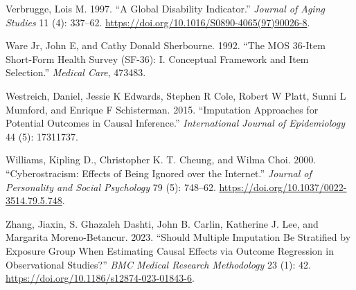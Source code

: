 \documentclass[
  singlecolumn]{report}
\newlength{\cslhangindent}
\newlength{\cslentryspacingunit} %
\newenvironment{CSLReferences}[2] %
 {%
  \setlength{\parindent}{0pt}
  \ifodd #1
  \let\oldpar\par
  \def\par{\hangindent=\cslhangindent\oldpar}
  \fi
  \setlength{\parskip}{#2\cslentryspacingunit}
 }%
 {}
\begin{document}
\begin{CSLReferences}{1}{0}
\leavevmode{}%
Verbrugge, Lois M. 1997. {``A Global Disability Indicator.''}
\emph{Journal of Aging Studies} 11 (4): 337--62.
\url{https://doi.org/10.1016/S0890-4065(97)90026-8}.

\leavevmode{}%
Ware Jr, John E, and Cathy Donald Sherbourne. 1992. {``The MOS 36-Item
Short-Form Health Survey (SF-36): I. Conceptual Framework and Item
Selection.''} \emph{Medical Care}, 473483.

\leavevmode{}%
Westreich, Daniel, Jessie K Edwards, Stephen R Cole, Robert W Platt,
Sunni L Mumford, and Enrique F Schisterman. 2015. {``Imputation
Approaches for Potential Outcomes in Causal Inference.''}
\emph{International Journal of Epidemiology} 44 (5): 17311737.

\leavevmode{}%
Williams, Kipling D., Christopher K. T. Cheung, and Wilma Choi. 2000.
{``Cyberostracism: Effects of Being Ignored over the Internet.''}
\emph{Journal of Personality and Social Psychology} 79 (5): 748--62.
\url{https://doi.org/10.1037/0022-3514.79.5.748}.

\leavevmode{}%
Zhang, Jiaxin, S. Ghazaleh Dashti, John B. Carlin, Katherine J. Lee, and
Margarita Moreno-Betancur. 2023. {``Should Multiple Imputation Be
Stratified by Exposure Group When Estimating Causal Effects via Outcome
Regression in Observational Studies?''} \emph{BMC Medical Research
Methodology} 23 (1): 42.
\url{https://doi.org/10.1186/s12874-023-01843-6}.

\end{CSLReferences}
\end{document}
